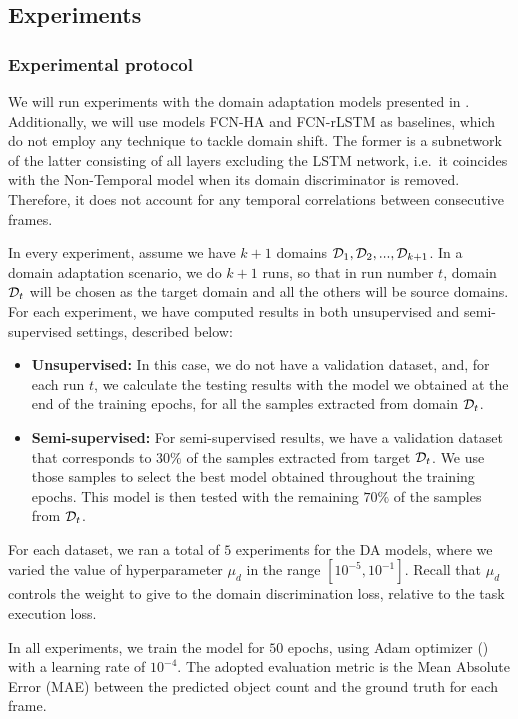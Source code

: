 \subsection{Experiments}

\subsubsection{Experimental protocol}

We will run experiments with the domain adaptation models presented in . Additionally, we will use models FCN-HA and FCN-rLSTM as baselines, which do not employ any technique to tackle domain shift. The former is a subnetwork of the latter consisting of all layers excluding the LSTM network, i.e.\ it coincides with the Non-Temporal model when its domain discriminator is removed. Therefore, it does not account for any temporal correlations between consecutive frames.

In every experiment, assume we have $k+1$ domains ${\mathcal{D}}_1, {\mathcal{D}}_2,...,{\mathcal{D}}_{k+1}$. In a domain adaptation scenario, we do $k+1$ runs, so that in run number $t$, domain ${\mathcal{D}}_t$ will be chosen as the target domain and all the others will be source domains. For each experiment, we have computed results in both unsupervised and semi-supervised settings, described below:

\begin{itemize}
	\item \textbf{Unsupervised:} In this case, we do not have a validation dataset, and, for each run $t$, we calculate the testing results with the model we obtained at the end of the training epochs, for all the samples extracted from domain ${\mathcal{D}}_t$.
	\item \textbf{Semi-supervised:} For semi-supervised results, we have a validation dataset that corresponds to $30\%$ of the samples extracted from target ${\mathcal{D}}_t$. We use those samples to select the best model obtained throughout the training epochs. This model is then tested with the remaining $70\%$ of the samples from ${\mathcal{D}}_t$.
\end{itemize}

For each dataset, we ran a total of $5$ experiments for the DA models, where we varied the value of hyperparameter $\mu_d$ in the range $[10^{-5}, 10^{-1}]$. Recall that $\mu_d$ controls the weight to give to the domain discrimination loss, relative to the task execution loss.

In all experiments, we train the model for $50$ epochs, using Adam optimizer (\citet{Kingma2014}) with a learning rate of $10^{-4}$. The adopted evaluation metric is the Mean Absolute Error (MAE) between the predicted object count and the ground truth for each frame.

